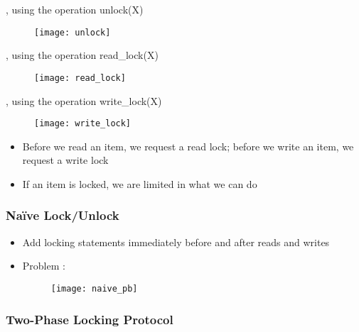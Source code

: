 \begin{minipage}[t]{0.48\textwidth}
    , using the operation unlock(X)
    \begin{figure}[H]
        \centering
        \texttt{[image: unlock]}
    \end{figure}
\end{minipage}
\hfill
\begin{minipage}[t]{0.48\textwidth}
    , using the operation read\_lock(X)
    \begin{figure}[H]
        \centering
        \texttt{[image: read\_lock]}
    \end{figure}
\end{minipage}
\begin{center}
    \begin{minipage}[t]{0.48\textwidth}
        , using the operation write\_lock(X)
        \begin{figure}[H]
            \centering
            \texttt{[image: write\_lock]}
        \end{figure}
    \end{minipage}
\end{center}

\begin{itemize}
    \item Before we read an item, we request a read lock; before we write an item, we request a write lock
    \item If an item is locked, we are limited in what we can do
\end{itemize}

\subsubsection{Naïve Lock/Unlock}

\begin{itemize}
    \item Add locking statements immediately before and after reads and writes
    \item Problem :
    \begin{figure}[H]
        \centering
        \texttt{[image: naive\_pb]}
    \end{figure}
\end{itemize}

\subsubsection{Two-Phase Locking Protocol}

